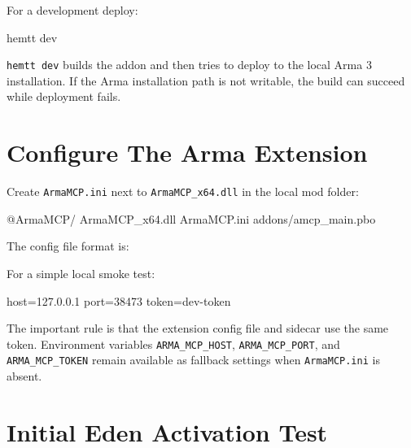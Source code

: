 \documentclass[11pt]{article}
\newcommand{\code}[1]{\texttt{#1}}
\begin{document}
For a development deploy:

\begin{commandblock}
hemtt dev
\end{commandblock}

\code{hemtt dev} builds the addon and then tries to deploy to the local Arma 3
installation. If the Arma installation path is not writable, the build can succeed
while deployment fails.

\section{Configure The Arma Extension}

Create \code{ArmaMCP.ini} next to \code{ArmaMCP\_x64.dll} in the local mod folder:

\begin{commandblock}
@ArmaMCP/
  ArmaMCP_x64.dll
  ArmaMCP.ini
  addons/amcp_main.pbo
\end{commandblock}

The config file format is:

For a simple local smoke test:

\begin{commandblock}
host=127.0.0.1
port=38473
token=dev-token
\end{commandblock}

The important rule is that the extension config file and sidecar use the same token.
Environment variables \code{ARMA\_MCP\_HOST}, \code{ARMA\_MCP\_PORT}, and
\code{ARMA\_MCP\_TOKEN} remain available as fallback settings when
\code{ArmaMCP.ini} is absent.

\section{Initial Eden Activation Test}
\end{document}
